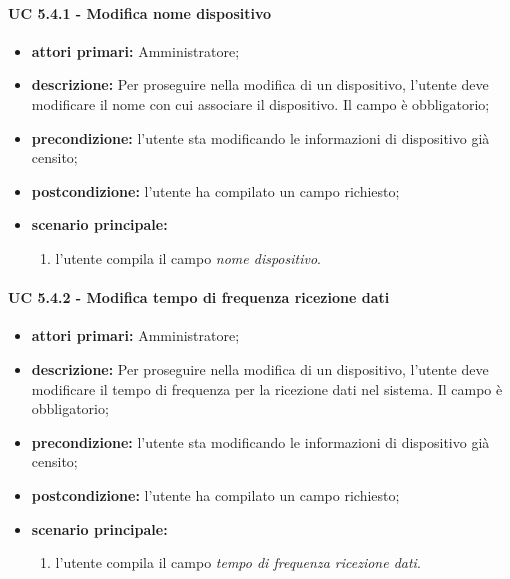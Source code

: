 			
				\paragraph{UC 5.4.1 - Modifica nome dispositivo}
				\begin{itemize}
					\item \textbf{attori primari:} Amministratore;
					\item \textbf{descrizione:} Per proseguire nella modifica di un dispositivo, l'utente deve modificare il nome con cui associare il dispositivo. Il campo è obbligatorio;
					\item \textbf{precondizione:} l'utente sta modificando le informazioni di dispositivo già censito;
					\item \textbf{postcondizione:} l'utente ha compilato un campo richiesto;
					\item \textbf{scenario principale:}
					\begin{enumerate}
						\item{l'utente compila il campo \textit{nome dispositivo}.}
					\end{enumerate}
				\end{itemize}

				\paragraph{UC 5.4.2 - Modifica tempo di frequenza ricezione dati}
				\begin{itemize}
					\item \textbf{attori primari:} Amministratore;
					\item \textbf{descrizione:} Per proseguire nella modifica di un dispositivo, l'utente deve modificare il tempo di frequenza per la ricezione dati nel sistema. Il campo è obbligatorio;
					\item \textbf{precondizione:} l'utente sta modificando le informazioni di dispositivo già censito;
					\item \textbf{postcondizione:} l'utente ha compilato un campo richiesto;
					\item \textbf{scenario principale:}
					\begin{enumerate}
						\item{l'utente compila il campo \textit{tempo di frequenza ricezione dati}.}
					\end{enumerate}
				\end{itemize}


